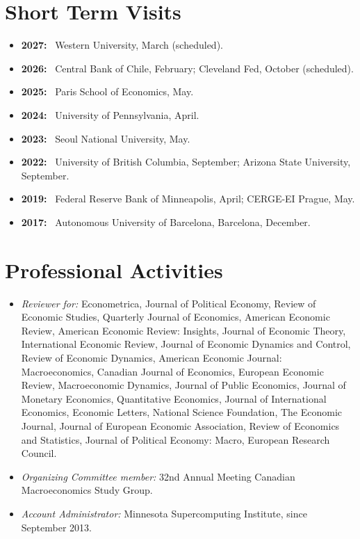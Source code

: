 \documentclass[letterpaper]{article}
\newcommand{\yr}[1]{\textbf{#1:}\ }
\begin{document}
\section*{Short Term Visits}
\begin{itemize}
\item \yr{2027} Western University, March (scheduled).
\item \yr{2026} Central Bank of Chile, February; Cleveland Fed, October (scheduled).
\item \yr{2025} Paris School of Economics, May.
\item \yr{2024} University of Pennsylvania, April.
\item \yr{2023} Seoul National University, May.
\item \yr{2022} University of British Columbia, September; Arizona State University, September.
\item \yr{2019} Federal Reserve Bank of Minneapolis, April; CERGE-EI Prague, May.
\item \yr{2017} Autonomous University of Barcelona, Barcelona, December.
\end{itemize}

\section*{Professional Activities}
\begin{itemize}
\item \textit{Reviewer for:} Econometrica, Journal of Political Economy, Review of Economic Studies, Quarterly Journal of Economics, American Economic Review, American Economic Review: Insights, Journal of Economic Theory, International Economic Review, Journal of Economic Dynamics and Control, Review of Economic Dynamics, American Economic Journal: Macroeconomics, Canadian Journal of Economics, European Economic Review, Macroeconomic Dynamics, Journal of Public Economics, Journal of Monetary Economics, Quantitative Economics, Journal of International Economics, Economic Letters, National Science Foundation, The Economic Journal, Journal of European Economic Association, Review of Economics and Statistics, Journal of Political Economy: Macro, European Research Council.
\item \textit{Organizing Committee member:} 32nd Annual Meeting Canadian Macroeconomics Study Group.
\item \textit{Account Administrator:} Minnesota Supercomputing Institute, since September 2013.
\end{itemize}
\end{document}
